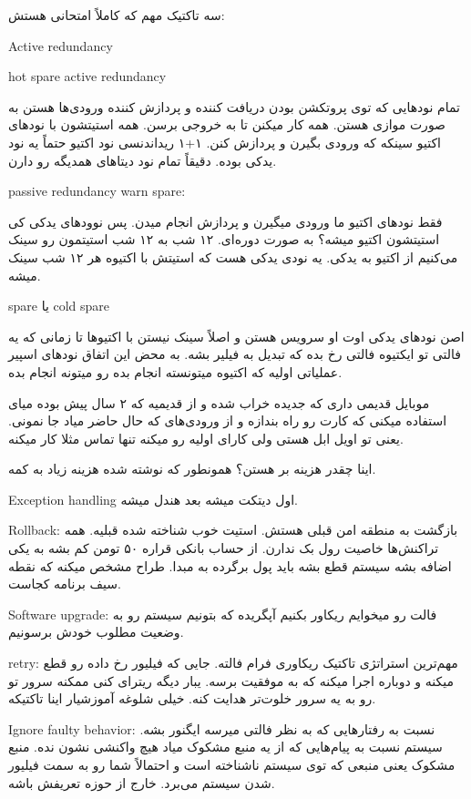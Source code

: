 سه تاکتیک مهم که کاملاً امتحانی هستش:

Active redundancy

hot spare active redundancy

تمام نود‌هایی که توی پروتکشن بودن دریافت کننده و پردازش کننده ورودی‌ها هستن به
صورت موازی هستن. همه کار میکنن تا به خروجی برسن. همه استیتشون با نود‌های اکتیو
سینکه که ورودی بگیرن و پردازش کنن. ۱+۱ ریداندنسی نود اکتیو حتماً یه نود یدکی
بوده. دقیقاً تمام نود دیتا‌های همدیگه رو دارن.

passive redundancy warn spare:

فقط نود‌های اکتیو ما ورودی میگیرن و پردازش انجام میدن. پس نوود‌های یدکی کی
استیتشون اکتیو میشه؟ به صورت دوره‌ای. ۱۲ شب به ۱۲ شب استیتمون رو سینک می‌کنیم از
اکتیو به یدکی. یه نودی یدکی هست که استیتش با اکتیوه هر ۱۲ شب سینک میشه.

spare یا cold spare

اصن نود‌های یدکی اوت او سرویس هستن و اصلاً سینک نیستن با اکتیو‌ها تا زمانی که یه
فالتی تو ایکتیوه فالتی رخ بده که تبدیل به فیلیر بشه. به محض این اتفاق نود‌های
اسپیر عملیاتی اولیه که اکتیوه میتونسته انجام بده رو میتونه انجام بده.

موبایل قدیمی داری که جدیده خراب شده و از قدیمیه که ۲ سال پیش بوده میای استفاده
میکنی که کارت رو راه بندازه و از ورودی‌های که حال حاضر میاد جا نمونی. یعنی تو
اویل ابل هستی ولی کارای اولیه رو میکنه تنها تماس مثلا کار میکنه.

اینا چقدر هزینه بر هستن؟ همونطور که نوشته شده هزینه زیاد به کمه.

Exception handling اول دیتکت میشه بعد هندل میشه.

Rollback: بازگشت به منطقه امن قبلی هستش. استیت خوب شناخته شده قبلیه. همه
تراکنش‌ها خاصیت رول بک ندارن. از حساب بانکی قراره ۵۰ تومن کم بشه به یکی اضافه
بشه سیستم قطع بشه باید پول برگرده به مبدا. طراح مشخص میکنه که نقطه سیف برنامه
کجاست.

Software upgrade: فالت رو میخوایم ریکاور بکنیم آپگریده که بتونیم سیستم رو به
وضعیت مطلوب خودش برسونیم.

retry: مهم‌ترین استراتژی تاکتیک ریکاوری فرام فالته. جایی که فیلیور رخ داده رو
قطع میکنه و دوباره اجرا میکنه که به موفقیت برسه. یبار دیگه ریترای کنی ممکنه سرور
تو رو به یه سرور خلوت‌تر هدایت کنه. خیلی شلوغه آموزشیار اینا تاکتیکه.

Ignore faulty behavior: نسبت به رفتار‌هایی که به نظر فالتی میرسه ایگنور بشه.
سیستم نسبت به پیام‌هایی که از یه منبع مشکوک میاد هیچ واکنشی نشون نده. منبع مشکوک
یعنی منبعی که توی سیستم ناشناخته است و احتمالاً شما رو به سمت فیلیور شدن سیستم
می‌برد. خارج از حوزه تعریفش باشه.

